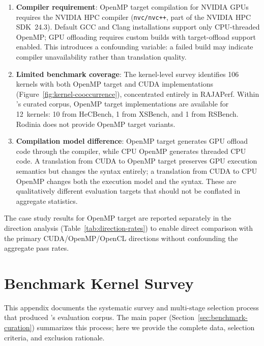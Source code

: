\begin{enumerate}
    \item \textbf{Compiler requirement}: OpenMP target compilation for NVIDIA GPUs requires the NVIDIA HPC compiler (\texttt{nvc/nvc++}, part of the NVIDIA HPC SDK~24.3). Default GCC and Clang installations support only CPU-threaded OpenMP; GPU offloading requires custom builds with target-offload support enabled. This introduces a confounding variable: a failed build may indicate compiler unavailability rather than translation quality.
    
    \item \textbf{Limited benchmark coverage}: The kernel-level survey identifies 106 kernels with both OpenMP target and CUDA implementations (Figure~\ref{fig:kernel-cooccurrence}), concentrated entirely in RAJAPerf. Within \parbench{}'s curated corpus, OpenMP target implementations are available for 12~kernels: 10 from HeCBench, 1 from XSBench, and 1 from RSBench. Rodinia does not provide OpenMP target variants.
    
    \item \textbf{Compilation model difference}: OpenMP target generates GPU offload code through the compiler, while CPU OpenMP generates threaded CPU code. A translation from CUDA to OpenMP target preserves GPU execution semantics but changes the syntax entirely; a translation from CUDA to CPU OpenMP changes both the execution model and the syntax. These are qualitatively different evaluation targets that should not be conflated in
    aggregate statistics.
\end{enumerate}

The case study results for OpenMP target are reported separately in the direction analysis (Table~\ref{tab:direction-rates}) to enable direct comparison with the primary CUDA/OpenMP/OpenCL directions without confounding the aggregate pass rates.



\section{Benchmark Kernel Survey}
\label{sec:appendix-c}

This appendix documents the systematic survey and multi-stage selection process that produced \parbench{}'s evaluation corpus. The main paper (Section~\ref{sec:benchmark-curation}) summarizes this process; here we provide the complete data, selection criteria,
and exclusion rationale.


